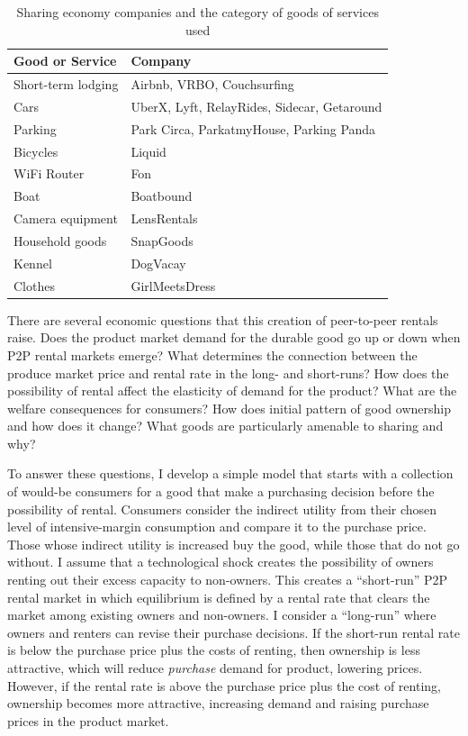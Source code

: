 \documentclass[11pt]{article}
\begin{document}
\begin{table}
\caption{Sharing economy companies and the category of goods of services used}
\centering
\begin{tabular}{ll} 
\toprule
Good or Service & Company \\ 
\hline 
Short-term lodging   & Airbnb, VRBO, Couchsurfing  \\ 
Cars            & UberX, Lyft, RelayRides, Sidecar, Getaround  \\   
Parking         & Park Circa, ParkatmyHouse, Parking Panda \\
Bicycles        & Liquid \\   
WiFi Router     & Fon \\ 
Boat            & Boatbound \\
Camera equipment& LensRentals  \\  
Household goods & SnapGoods   \\ 
Kennel          & DogVacay    \\ 
Clothes         & GirlMeetsDress \\
\bottomrule
\end{tabular}  
\end{table}

There are several economic questions that this creation of peer-to-peer rentals raise. 
Does the product market demand for the durable good go up or down when P2P rental markets emerge?  
What determines the connection between the produce market price and rental rate in the long- and short-runs? 
How does the possibility of rental affect the elasticity of demand for the product? 
What are the welfare consequences for consumers? 
How does initial pattern of good ownership and how does it change? 
What goods are particularly amenable to sharing and why?  

To answer these questions, I develop a simple model that starts with a collection of would-be consumers for a good that make a purchasing decision before the possibility of rental.
Consumers consider the indirect utility from their chosen level of intensive-margin consumption and compare it to the purchase price. 
Those whose indirect utility is increased buy the good, while those that do not go without.  
I assume that a technological shock creates the possibility of owners renting out their excess capacity to non-owners. 
This creates a ``short-run'' P2P rental market in which equilibrium is defined by a rental rate that clears the market among existing owners and non-owners. 
I consider a ``long-run'' where owners and renters can revise their purchase decisions.  
If the short-run rental rate is below the purchase price plus the costs of renting, then ownership is less attractive, which will reduce \emph{purchase} demand for product, lowering prices. 
However, if the rental rate is above the purchase price plus the cost of renting, ownership becomes more attractive, increasing demand and raising purchase prices in the product market. 
\end{document}
